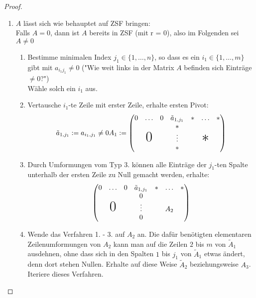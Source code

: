 \documentclass[a4paper]{scrartcl}
\theoremstyle{definition}
\theoremstyle{plain}
\theoremstyle{plain}
\theoremstyle{remark}
\theoremstyle{remark}
\theoremstyle{remark}
\theoremstyle{remark}
\theoremstyle{remark}
\begin{document}
\begin{proof}
\begin{enumerate}
\item $A$ lässt sich wie behauptet auf ZSF bringen: \\
     Falls $A = 0$, dann ist $A$ bereits in ZSF (mit r = 0), also im Folgenden sei $A \neq 0$ \\
\begin{enumerate}
\item Bestimme minimalen Index $j_1 \in \{1, \ldots, n\}$, so dass es ein $i_1 \in \{1, \ldots, m\}$ gibt mit $a_{i_1 j_1} \neq 0$ ("Wie weit links in der Matrix $A$ befinden sich Einträge $\neq 0$?") \\
        Wähle solch ein $i_1$ aus.
\item Vertausche $i_1$-te Zeile mit erster Zeile, erhalte ersten Pivot:
\begin{equation}
\tilde a_{1, j_1} := a_{i_1, j_1} \neq 0 \\
A_1 :=
\begin{pmatrix}
0 & \ldots & 0 & \tilde a_{1, j_1} & \ast & \ldots & \ast \\
  &        &   &       \ast        &  & & \\
& \text{\huge0} & & \vdots & & \text{\huge$\ast$} & \\
& & & \ast & & & \\
\end{pmatrix}
\end{equation}
\item Durch Umformungen vom Typ 3. können alle Einträge der $j_1$-ten Spalte unterhalb der ersten Zeile zu Null gemacht werden, erhalte:
\begin{equation}
\begin{pmatrix}
0 & \ldots & 0 & \tilde a_{1, j_1} & \ast & \ldots & \ast \\
  &        &   &       0        &  & & \\
& \text{\huge0} & & \vdots & & A_2 & \\
& & & 0 & & & \\
\end{pmatrix}
\end{equation}
\item Wende das Verfahren 1. - 3. auf $A_2$ an. Die dafür benötigten elementaren Zeilenumformungen von $A_2$ kann man
auf die Zeilen $2$ bis $m$ von $\tilde A_1$ ausdehnen, ohne dass sich in den Spalten $1$ bis $j_1$ von $\tilde A_1$ etwas ändert, denn
dort stehen Nullen. Erhalte auf diese Weise $\tilde A_2$ beziehungsweise $A_3$. Iteriere dieses Verfahren.

\end{enumerate}
\end{enumerate}
\end{proof}
\end{document}
